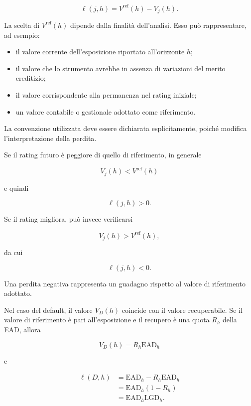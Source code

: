 \[
\ell(j,h)
=
V^{\mathrm{ref}}(h)-V_j(h).
\]

La scelta di $V^{\mathrm{ref}}(h)$ dipende dalla finalit\`{a}
dell'analisi. Esso pu\`{o} rappresentare, ad esempio:

\begin{itemize}

\item il valore corrente dell'esposizione riportato all'orizzonte
$h$;

\item il valore che lo strumento avrebbe in assenza di variazioni del
merito creditizio;

\item il valore corrispondente alla permanenza nel rating iniziale;

\item un valore contabile o gestionale adottato come riferimento.

\end{itemize}

La convenzione utilizzata deve essere dichiarata esplicitamente,
poich\'{e} modifica l'interpretazione della perdita.

Se il rating futuro \`{e} peggiore di quello di riferimento, in
generale

\[
V_j(h)<V^{\mathrm{ref}}(h)
\]

e quindi

\[
\ell(j,h)>0.
\]

Se il rating migliora, pu\`{o} invece verificarsi

\[
V_j(h)>V^{\mathrm{ref}}(h),
\]

da cui

\[
\ell(j,h)<0.
\]

Una perdita negativa rappresenta un guadagno rispetto al valore di
riferimento adottato.

Nel caso del default, il valore $V_D(h)$ coincide con il valore
recuperabile. Se il valore di riferimento \`{e} pari all'esposizione
e il recupero \`{e} una quota $R_h$ della EAD, allora

\[
V_D(h)
=
R_h\mathrm{EAD}_h
\]

e

\[
\begin{split}
\ell(D,h)
&=
\mathrm{EAD}_h
-
R_h\mathrm{EAD}_h
\\
&=
\mathrm{EAD}_h(1-R_h)
\\
&=
\mathrm{EAD}_h\mathrm{LGD}_h.
\end{split}
\]


